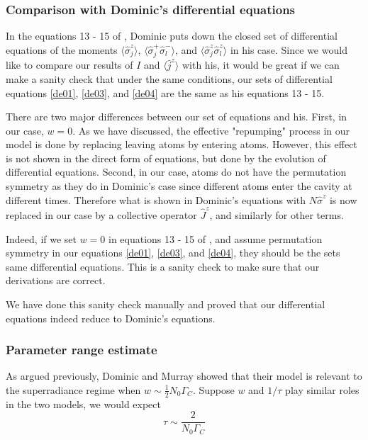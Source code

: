 \documentclass{article}
\newcommand{\gc}{\Gamma_C}
\begin{document}
\subsubsection{Comparison with Dominic's differential equations}
In the equations 13 - 15 of \cite{fluctuation_ssLaser}, Dominic puts down the closed set of differential equations of the moments $\langle\hat{\sigma}^z_j\rangle$, $\langle\hat{\sigma}^+_j\hat{\sigma}^-_l\rangle$, and $\langle\hat{\sigma}_j^z \hat{\sigma}_l^z\rangle$ in his case. Since we would like to compare our results of $I$ and $\langle \hat{j}^z \rangle$ with his, it would be great if we can make a sanity check that under the same conditions, our sets of differential equations \ref{de01}, \ref{de03}, and \ref{de04} are the same as his equations 13 - 15. 

There are two major differences between our set of equations and his. First, in our case, $w=0$. As we have discussed, the effective "repumping" process in our model is done by replacing leaving atoms by entering atoms. However, this effect is not shown in the direct form of equations, but done by the evolution of differential equations. Second, in our case, atoms do not have the permutation symmetry as they do in Dominic's case since different atoms enter the cavity at different times. Therefore what is shown in Dominic's equations with $N\hat{\sigma}^z$ is now replaced in our case by a collective operator $\hat{J}^z$, and similarly for other terms. 

Indeed, if we set $w=0$ in equations 13 - 15 of \cite{fluctuation_ssLaser}, and assume permutation symmetry in our equations \ref{de01}, \ref{de03}, and \ref{de04}, they should be the sets same differential equations. This is a sanity check to make sure that our derivations are correct.

We have done this sanity check manually and proved that our differential equations indeed reduce to Dominic's equations.


\subsubsection{Parameter range estimate}
As argued previously, Dominic and Murray showed that their model is relevant to the superradiance regime when $w\sim \frac{1}{2}N_0 \gc$. Suppose $w$ and $1/\tau$ play similar roles in the two models, we would expect
\begin{equation}
    \tau \sim \frac{2}{N_0 \gc}
\end{equation}
\end{document}
